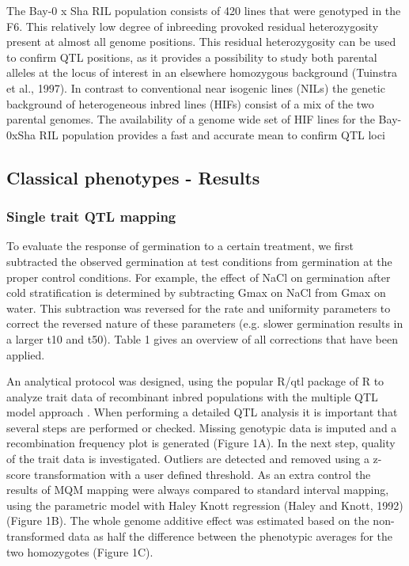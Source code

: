 \documentclass[8pt, twoside, a5paper]{report}
\begin{document}
The Bay-0 x Sha RIL population consists of 420 lines that were genotyped in the F6. This relatively low degree of inbreeding provoked residual 
heterozygosity present at almost all genome positions. This residual heterozygosity can be used to confirm QTL positions, as it provides a 
possibility to study both parental alleles at the locus of interest in an elsewhere homozygous background (Tuinstra et al., 1997). In contrast to
conventional near isogenic lines (NILs) the genetic background of heterogeneous inbred lines (HIFs) consist of a mix of the two parental genomes. 
The availability of a genome wide set of HIF lines for the Bay-0xSha RIL population provides a fast and accurate mean to confirm QTL loci

\subsection{Classical phenotypes - Results}

\subsubsection{Single trait QTL mapping}
To evaluate the response of germination to a certain treatment, we first subtracted the observed germination at test conditions from germination 
at the proper control conditions. For example, the effect of NaCl on germination after cold stratification is determined by subtracting Gmax on 
NaCl from Gmax on water. This subtraction was reversed for the rate and uniformity parameters to correct the reversed nature of these parameters 
(e.g. slower germination results in a larger t10 and t50). Table 1 gives an overview of all corrections that have been applied. 

An analytical protocol was designed, using the popular R/qtl package of R to analyze trait data of recombinant inbred populations with the multiple 
QTL model approach \cite{Arends:2010}. When performing a detailed QTL analysis it is important that several steps are performed or checked. 
Missing genotypic data is imputed and a recombination frequency plot is generated (Figure 1A). In the next step, quality of the trait data is 
investigated. Outliers are detected and removed using a z-score transformation with a user defined threshold. As an extra control the results of 
MQM mapping were always compared to standard interval mapping, using the parametric model with Haley Knott regression (Haley and Knott, 1992) 
(Figure 1B). The whole genome additive effect was estimated based on the non-transformed data as half the difference between the phenotypic
averages for the two homozygotes (Figure 1C).
\end{document}
